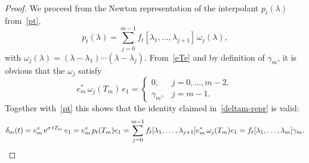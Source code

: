\documentclass[smallextended]{svjour3pre}%
\numberwithin{equation}{section}
\numberwithin{figure}{section}
\numberwithin{table}{section}
\newcommand{\divdif}[2]{#2[#1]}
\newcommand{\dd}{\mathrm{d}}
\newcommand{\ee}{{\rm e}}
\newcommand\sca{\sigma}
\begin{document}
\begin{proof}
We proceed from the Newton representation of the
interpolant $p_t(\lambda) $ from~\eqref{pt},
\begin{equation*}
p_t(\lambda) = \sum_{j=0}^{m-1}
               \divdif{\lambda_1,\ldots,\lambda_{j+1}}{f_t}\,\omega_j(\lambda),
\end{equation*}
with
$ \omega_j(\lambda) = (\lambda-\lambda_1) \cdots (\lambda-\lambda_{j}) $.
{From~\eqref{eTe} and by definition of $ \gamma_m $, %
it is obvious that the $ \omega_j $ satisfy}
\begin{equation*}
e_m^\ast\,\omega_j(T_m)\,e_1 =
\left\{\begin{array}{ll}
0,       & j=0,\ldots,m-2, \\
\gamma_m,& j=m-1.
\end{array}\right.
\end{equation*}
Together with~\eqref{pt} this shows that the identity claimed
in~\eqref{deltam-repr} is valid:
\begin{equation*}
\delta_m(t)
= e_m^\ast\,\ee^{\sca\,t T_m}\,e_1
= e_m^\ast\,p_t(T_m) e_1
= \sum_{j=0}^{m-1} \divdif{\lambda_1,\ldots,\lambda_{j+1}}{f_t} e_m^\ast\,\omega_j(T_m)e_1
= \divdif{\lambda_1,\ldots,\lambda_m}{f_t} \gamma_m.
\end{equation*}

\end{proof}
\end{document}
